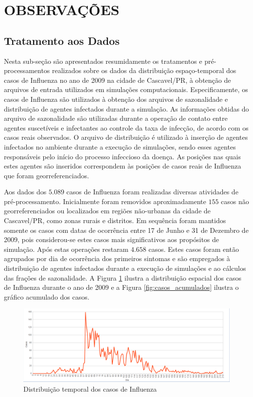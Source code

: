 \section{OBSERVAÇÕES}
\label{sec:observacoes}

\subsection{Tratamento aos Dados}

Nesta sub-seção são apresentados resumidamente os tratamentos e pré-processamentos realizados sobre os dados da distribuição espaço-temporal dos casos de Influenza no ano de 2009 na cidade de Cascavel/PR, à obtenção de arquivos de entrada utilizados em simulações computacionais. Especificamente, os casos de Influenza são utilizados à obtenção dos arquivos de sazonalidade e distribuição de agentes infectados durante a simulação. As informações obtidas do arquivo de sazonalidade são utilizadas durante a operação de contato entre agentes suscetíveis e infectantes ao controle da taxa de infecção, de acordo com os casos reais observados. O arquivo de distribuição é utilizado à inserção de agentes infectados no ambiente durante a execução de simulações, sendo esses agentes responsáveis pelo início do processo infeccioso da doença. As posições nas quais estes agentes são inseridos correspondem às posições de casos reais de Influenza que foram georreferenciados. 

Aos dados dos $5.089$ casos de Influenza foram realizadas diversas atividades de pré-processamento. Inicialmente foram removidos aproximadamente $155$ casos não georreferenciados ou localizados em regiões não-urbanas da cidade de Cascavel/PR, como zonas rurais e distritos. Em sequência foram mantidos somente os casos com datas de ocorrência entre 17 de Junho e 31 de Dezembro de 2009, pois considerou-se estes casos mais significativos aos propósitos de simulação. Após estas operações restaram $4.658$ casos. Estes casos foram então agrupados por dia de ocorrência dos primeiros sintomas e são empregados à distribuição de agentes infectados durante a execução de simulações e ao cálculos das frações de sazonalidade. A Figura \ref{fig:casos} ilustra a distribuição espacial dos casos de Influenza durante o ano de 2009 e a Figura \ref{fig:casos_acumulados} ilustra o gráfico acumulado dos casos.

\begin{figure}[H]
  \centering
  \includegraphics[width=1\textwidth]{Figuras/Observacoes/Casos.png}
  \caption{Distribuição temporal dos casos de Influenza}
  \label{fig:casos}
\end{figure} 

